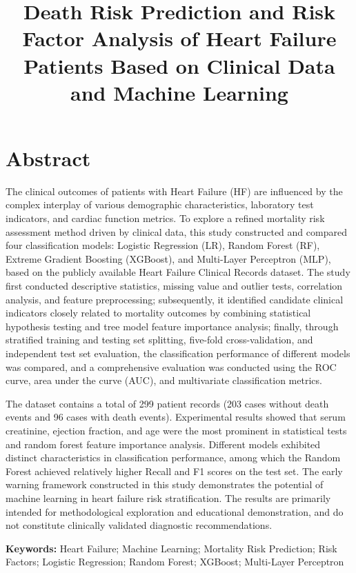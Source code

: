 \documentclass[12pt, a4paper]{article}
\title{\textbf{Death Risk Prediction and Risk Factor Analysis of Heart Failure Patients Based on Clinical Data and Machine Learning}}
\begin{document}
\date{}
\maketitle

\section*{Abstract}
The clinical outcomes of patients with Heart Failure (HF) are influenced by the complex interplay of various demographic characteristics, laboratory test indicators, and cardiac function metrics. To explore a refined mortality risk assessment method driven by clinical data, this study constructed and compared four classification models: Logistic Regression (LR), Random Forest (RF), Extreme Gradient Boosting (XGBoost), and Multi-Layer Perceptron (MLP), based on the publicly available Heart Failure Clinical Records dataset. The study first conducted descriptive statistics, missing value and outlier tests, correlation analysis, and feature preprocessing; subsequently, it identified candidate clinical indicators closely related to mortality outcomes by combining statistical hypothesis testing and tree model feature importance analysis; finally, through stratified training and testing set splitting, five-fold cross-validation, and independent test set evaluation, the classification performance of different models was compared, and a comprehensive evaluation was conducted using the ROC curve, area under the curve (AUC), and multivariate classification metrics.

The dataset contains a total of 299 patient records (203 cases without death events and 96 cases with death events). Experimental results showed that serum creatinine, ejection fraction, and age were the most prominent in statistical tests and random forest feature importance analysis. Different models exhibited distinct characteristics in classification performance, among which the Random Forest achieved relatively higher Recall and F1 scores on the test set. The early warning framework constructed in this study demonstrates the potential of machine learning in heart failure risk stratification. The results are primarily intended for methodological exploration and educational demonstration, and do not constitute clinically validated diagnostic recommendations.

\noindent\textbf{Keywords: }Heart Failure; Machine Learning; Mortality Risk Prediction; Risk Factors; Logistic Regression; Random Forest; XGBoost; Multi-Layer Perceptron
\end{document}
